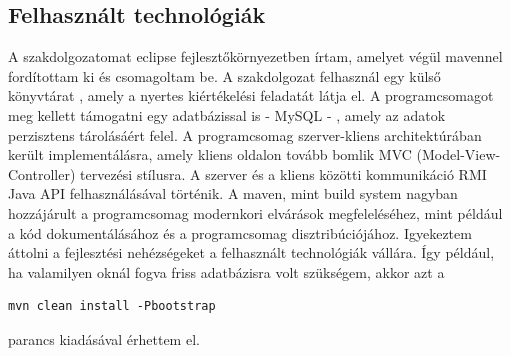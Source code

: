 \subsection{Felhasznált technológiák}
A szakdolgozatomat eclipse fejlesztőkörnyezetben írtam, amelyet végül mavennel fordítottam ki és csomagoltam be. A szakdolgozat felhasznál egy külső könyvtárat \cite{hand_eval}, amely a nyertes kiértékelési feladatát látja el. A programcsomagot meg kellett támogatni egy adatbázissal is - MySQL - , amely az adatok perzisztens tárolásáért felel. A programcsomag szerver-kliens architektúrában került implementálásra, amely kliens oldalon tovább bomlik MVC (Model-View-Controller) tervezési stílusra. A szerver és a kliens közötti kommunikáció RMI Java API felhasználásával történik. A maven, mint build system nagyban hozzájárult a programcsomag modernkori elvárások megfeleléséhez, mint például a kód dokumentálásához és a programcsomag disztribúciójához. Igyekeztem áttolni a fejlesztési nehézségeket a felhasznált technológiák vállára. Így például, ha valamilyen oknál fogva friss adatbázisra volt szükségem, akkor azt a
 \begin{verbatim}
mvn clean install -Pbootstrap
\end{verbatim}
parancs kiadásával érhettem el.

